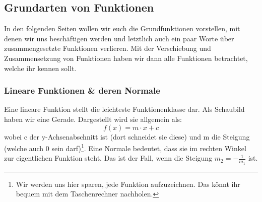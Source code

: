 \subsection{Grundarten von Funktionen}
In den folgenden Seiten wollen wir euch die Grundfunktionen vorstellen, mit denen wir uns beschäftigen werden und letztlich auch ein paar Worte über zusammengesetzte Funktionen verlieren. Mit der Verschiebung und Zusammensetzung von Funktionen haben wir dann alle Funktionen betrachtet, welche ihr kennen sollt.

	\subsubsection{Lineare Funktionen \& deren Normale}
Eine lineare Funktion stellt die leichteste Funktionenklasse dar. Als Schaubild haben wir eine Gerade. Dargestellt wird sie allgemein als:
\[f(x)=m\cdot x+c\]
wobei c der y-Achsenabschnitt ist (dort schneidet sie diese) und m die Steigung (welche auch 0 sein darf)\footnote{Wir werden uns hier sparen, jede Funktion aufzuzeichnen. Das könnt ihr bequem mit dem Taschenrechner nachholen.}. Eine Normale bedeutet, dass sie im rechten Winkel zur eigentlichen Funktion steht. Das ist der Fall, wenn die Steigung \(m_2=-\frac{1}{m_1}\) ist.

